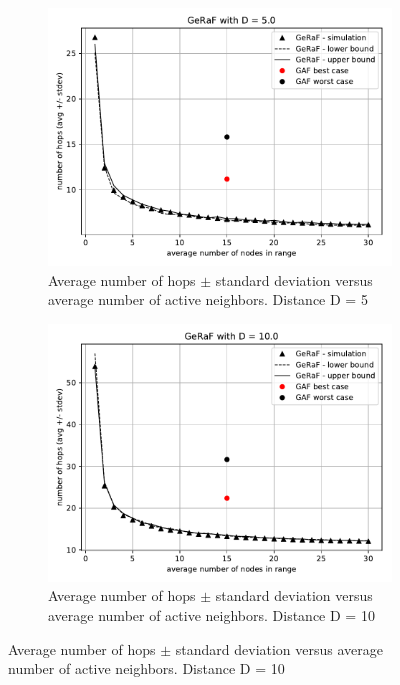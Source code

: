 \documentclass[11pt,a4paper]{article}
\begin{document}
\begin{figure}[ht]
\centering
\begin{subfigure}{.45\textwidth}
  \centering
  \includegraphics[width=\linewidth]{hops_bounds_D=5.pdf}
  \caption{Average number of hops $\pm$ standard deviation versus average number of active neighbors. Distance D = 5}
  \label{fig:hops5Bounds}
\end{subfigure}%
\hspace{0.5cm}
\begin{subfigure}{.45\textwidth}
  \centering
  \includegraphics[width=\linewidth]{hops_bounds_D=10.pdf}
  \caption{Average number of hops $\pm$ standard deviation versus average number of active neighbors. Distance D = 10}
  \label{fig:hops10Bounds}

\end{subfigure}
\end{figure}
\end{document}
